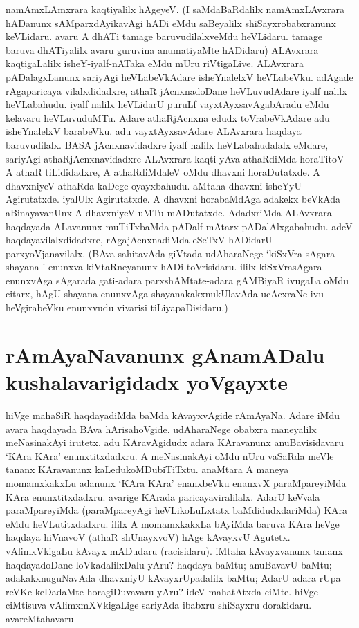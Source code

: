 namAmxLAmxrara kaqtiyalilx hAgeyeV. (I saMdaBaRdalilx namAmxLAvxrara hADanunx sAMparxdAyikavAgi hADi eMdu saBeyalilx shiSayxrobabxranunx keVLidaru. avaru A dhATi tamage baruvudilalxveMdu heVLidaru. tamage baruva dhATiyalilx avaru guruvina anumatiyaMte hADidaru) ALAvxrara kaqtigaLalilx isheY-iyalf-nATaka eMdu mUru riVtigaLive. ALAvxrara pADalagxLanunx sariyAgi heVLabeVkAdare isheYnalelxV heVLabeVku. adAgade rAgaparicaya vilalxdidadxre, athaR jAcnxnadoDane heVLuvudAdare iyalf nalilx heVLabahudu. iyalf nalilx heVLidarU puruLf vayxtAyxsavAgabAradu eMdu kelavaru heVLuvuduMTu. Adare athaRjAcnxna edudx toVrabeVkAdare adu isheYnalelxV barabeVku. adu vayxtAyxsavAdare ALAvxrara haqdaya baruvudilalx. BASA jAcnxnavidadxre  iyalf nalilx heVLabahudalalx eMdare, sariyAgi athaRjAcnxnavidadxre ALAvxrara kaqti yAva athaRdiMda horaTitoV A athaR tiLididadxre, A athaRdiMdaleV oMdu dhavxni horaDutatxde. A dhavxniyeV athaRda kaDege oyayxbahudu. aMtaha dhavxni isheYyU Agirutatxde. iyalUlx Agirutatxde. A dhavxni horabaMdAga adakekx beVkAda aBinayavanUnx A dhavxniyeV uMTu mADutatxde. AdadxriMda ALAvxrara haqdayada ALavanunx muTiTxbaMda pADalf mAtarx pADalAlxgabahudu. adeV haqdayavilalxdidadxre, rAgajAcnxnadiMda eSeTxV  hADidarU parxyoVjanavilalx. (BAva sahitavAda giVtada udAharaNege `kiSxVra sAgara shayana ' enunxva kiVtaRneyanunx hADi toVrisidaru. ililx kiSxVrasAgara enunxvAga sAgarada gati-adara parxshAMtate-adara gAMBiyaR ivugaLa oMdu citarx, hAgU shayana enunxvAga shayanakakxnukUlavAda ucAcxraNe ivu heVgirabeVku enunxvudu vivarisi tiLiyapaDisidaru.)

\section*{rAmAyaNavanunx gAnamADalu kushalavarigidadx yoVgayxte} 

hiVge mahaSiR haqdayadiMda baMda kAvayxvAgide rAmAyaNa. Adare iMdu avara haqdayada BAva hArisahoVgide. udAharaNege obabxra maneyalilx meNasinakAyi irutetx. adu KAravAgidudx adara KAravanunx anuBavisidavaru `KAra KAra' enunxtitxdadxru. A meNasinakAyi oMdu nUru vaSaRda meVle tananx KAravanunx kaLedukoMDubiTiTxtu. anaMtara A maneya momamxkakxLu adanunx `KAra KAra' enanxbeVku enanxvX paraMpareyiMda KAra enunxtitxdadxru. avarige KArada paricayaviralilalx. AdarU keVvala paraMpareyiMda (paraMpareyAgi heVLikoLuLxtatx baMdidudxdariMda) KAra eMdu heVLutitxdadxru. ililx A momamxkakxLa bAyiMda baruva KAra heVge haqdaya hiVnavoV (athaR shUnayxvoV) hAge kAvayxvU Agutetx. vAlimxVkigaLu kAvayx mADudaru (racisidaru). iMtaha kAvayxvanunx tananx haqdayadoDane loVkadalilxDalu yAru? haqdaya baMtu; anuBavavU baMtu; adakakxnuguNavAda dhavxniyU kAvayxrUpadalilx baMtu; AdarU adara rUpa reVKe keDadaMte horagiDuvavaru yAru? ideV mahatAtxda ciMte. hiVge  ciMtisuva vAlimxmXVkigaLige sariyAda ibabxru shiSayxru dorakidaru. avareMtahavaru-


